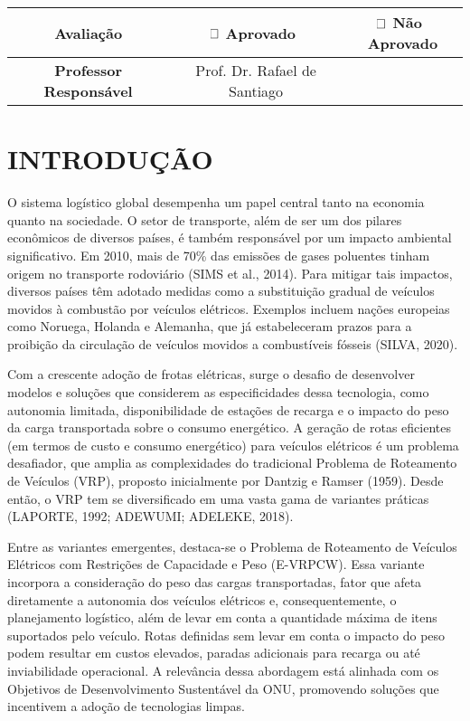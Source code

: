 \documentclass{ufscThesis}
\begin{document}
\newpage
\begin{table}[H] 
{
	\begin{tabular}{|c|c|c|c|}
\hline
\textbf{Avaliação} & \multicolumn{1}{c}{$\hspace{-.2cm}\Box$ Aprovado} & \multicolumn{2}{c|}{$\hspace{-.2cm}\Box$ Não Aprovado}\\\hline
\textbf{Professor Responsável} & Prof. Dr. Rafael de Santiago &  &\hspace{3.3cm} \\\hline	
	\end{tabular}
}
\end{table}


\sumario


\chapter{INTRODUÇÃO}

O sistema logístico global desempenha um papel central tanto na economia quanto na sociedade. O setor de transporte, além de ser um dos pilares econômicos de diversos países, é também responsável por um impacto ambiental significativo. Em 2010, mais de 70\% das emissões de gases poluentes tinham origem no transporte rodoviário (SIMS et al., 2014). Para mitigar tais impactos, diversos países têm adotado medidas como a substituição gradual de veículos movidos à combustão por veículos elétricos. Exemplos incluem nações europeias como Noruega, Holanda e Alemanha, que já estabeleceram prazos para a proibição da circulação de veículos movidos a combustíveis fósseis (SILVA, 2020).

Com a crescente adoção de frotas elétricas, surge o desafio de desenvolver modelos e soluções que considerem as especificidades dessa tecnologia, como autonomia limitada, disponibilidade de estações de recarga e o impacto do peso da carga transportada sobre o consumo energético. A geração de rotas eficientes (em termos de custo e consumo energético) para veículos elétricos é um problema desafiador, que amplia as complexidades do tradicional Problema de Roteamento de Veículos (VRP), proposto inicialmente por Dantzig e Ramser (1959). Desde então, o VRP tem se diversificado em uma vasta gama de variantes práticas (LAPORTE, 1992; ADEWUMI; ADELEKE, 2018).

Entre as variantes emergentes, destaca-se o Problema de Roteamento de Veículos Elétricos com Restrições de Capacidade e Peso (E-VRPCW). Essa variante incorpora a consideração do peso das cargas transportadas, fator que afeta diretamente a autonomia dos veículos elétricos e, consequentemente, o planejamento logístico, além de levar em conta a quantidade máxima de itens suportados pelo veículo. Rotas definidas sem levar em conta o impacto do peso podem resultar em custos elevados, paradas adicionais para recarga ou até inviabilidade operacional. A relevância dessa abordagem está alinhada com os Objetivos de Desenvolvimento Sustentável da ONU, promovendo soluções que incentivem a adoção de tecnologias limpas.
\end{document}
